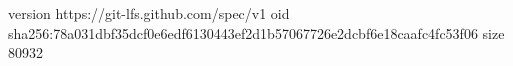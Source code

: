 version https://git-lfs.github.com/spec/v1
oid sha256:78a031dbf35dcf0e6edf6130443ef2d1b57067726e2dcbf6e18caafc4fc53f06
size 80932
